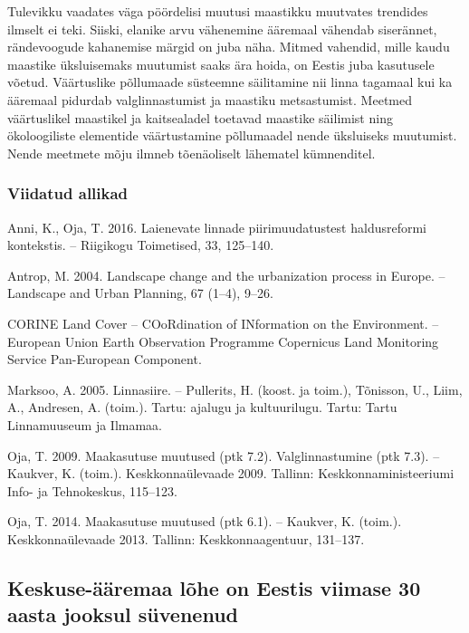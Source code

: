 \documentclass[estonian,]{article}
\begin{document}
Tulevikku vaadates väga pöördelisi muutusi maastikku muutvates trendides ilmselt ei teki. Siiski, elanike arvu vähenemine ääremaal vähendab siserännet, rändevoogude kahanemise märgid on juba näha. Mitmed vahendid, mille kaudu maastike üksluisemaks muutumist saaks ära hoida, on Eestis juba kasutusele võetud. Väärtuslike põllumaade süsteemne säilitamine nii linna tagamaal kui ka ääremaal pidurdab valglinnastumist ja maastiku metsastumist. Meetmed väärtuslikel maastikel ja kaitsealadel toetavad maastike säilimist ning ökoloogiliste elementide väärtustamine põllumaadel nende üksluiseks muutumist. Nende meetmete mõju ilmneb tõenäoliselt lähematel kümnenditel.

\hypertarget{viidatud-allikad-1}{%
\subsubsection*{Viidatud allikad}\label{viidatud-allikad-1}}

Anni, K., Oja, T. 2016. Laienevate linnade piirimuudatustest haldusreformi kontekstis. -- Riigikogu Toimetised, 33, 125--140.

Antrop, M. 2004. Landscape change and the urbanization process in Europe. -- Landscape and Urban Planning, 67 (1--4), 9--26.

CORINE Land Cover -- COoRdination of INformation on the Environment. -- European Union Earth Observation Programme Copernicus Land Monitoring Service Pan-European Component.

Marksoo, A. 2005. Linnasiire. -- Pullerits, H. (koost. ja toim.), Tõnisson, U., Liim, A., Andresen, A. (toim.). Tartu: ajalugu ja kultuurilugu. Tartu: Tartu Linnamuuseum ja Ilmamaa.

Oja, T. 2009. Maakasutuse muutused (ptk 7.2). Valglinnastumine (ptk 7.3). -- Kaukver, K. (toim.). Keskkonnaülevaade 2009. Tallinn: Keskkonnaministeeriumi Info- ja Tehnokeskus, 115--123.

Oja, T. 2014. Maakasutuse muutused (ptk 6.1). -- Kaukver, K. (toim.). Keskkonnaülevaade 2013. Tallinn: Keskkonnaagentuur, 131--137.

\hypertarget{keskuse-uxe4uxe4remaa-luxf5he-on-eestis-viimase-30-aasta-jooksul-suxfcvenenud}{%
\subsection{Keskuse-ääremaa lõhe on Eestis viimase 30 aasta jooksul süvenenud}\label{keskuse-uxe4uxe4remaa-luxf5he-on-eestis-viimase-30-aasta-jooksul-suxfcvenenud}}
\end{document}

